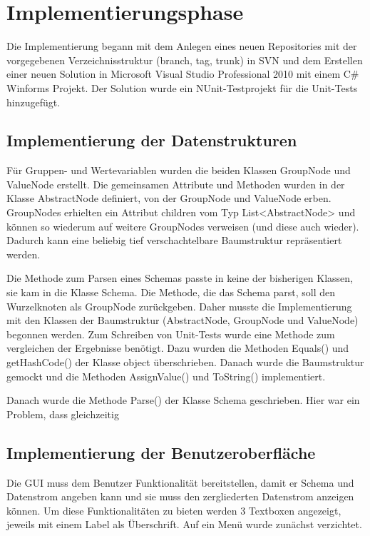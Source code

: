 \section{Implementierungsphase} 
\label{sec:Implementierungsphase}
Die Implementierung begann mit dem Anlegen eines neuen Repositories mit der vorgegebenen Verzeichnisstruktur (branch, tag, trunk) in SVN und dem Erstellen einer neuen Solution in Microsoft Visual Studio Professional 2010 mit einem C\# Winforms Projekt. Der Solution wurde ein NUnit-Testprojekt für die Unit-Tests hinzugefügt.

\subsection{Implementierung der Datenstrukturen}
\label{sec:ImplementierungDatenstrukturen}
Für Gruppen- und Wertevariablen wurden die beiden Klassen GroupNode und ValueNode erstellt. Die gemeinsamen Attribute und Methoden wurden in der Klasse AbstractNode definiert, von der GroupNode und ValueNode erben.
GroupNodes erhielten ein Attribut children vom Typ List<AbstractNode> und können so wiederum auf weitere GroupNodes verweisen (und diese auch wieder). Dadurch kann eine beliebig tief verschachtelbare Baumstruktur repräsentiert werden. 

Die Methode zum Parsen eines Schemas passte in keine der bisherigen Klassen, sie kam in die Klasse Schema. Die Methode, die das Schema parst, soll den Wurzelknoten als GroupNode zurückgeben. Daher musste die Implementierung mit den Klassen der Baumstruktur (AbstractNode, GroupNode und ValueNode) begonnen werden. Zum Schreiben von Unit-Tests wurde eine Methode zum vergleichen der Ergebnisse benötigt. Dazu wurden die Methoden Equals() und getHashCode() der Klasse object überschrieben. Danach wurde die Baumstruktur gemockt und die Methoden AssignValue() und ToString() implementiert.

Danach wurde die Methode Parse() der Klasse Schema geschrieben. Hier war ein Problem, dass gleichzeitig 


\subsection{Implementierung der Benutzeroberfläche}
\label{sec:ImplementierungBenutzeroberflaeche}
Die \ac{GUI} muss dem Benutzer Funktionalität bereitstellen, damit er Schema und Datenstrom angeben kann und sie muss den zergliederten Datenstrom anzeigen können.
Um diese Funktionalitäten zu bieten werden 3 Textboxen angezeigt, jeweils mit einem Label als Überschrift. Auf ein Menü wurde zunächst verzichtet.

